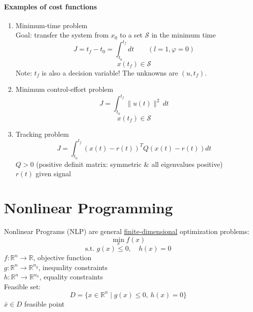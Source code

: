 \documentclass[12pt,a4paper,oneside]{scrartcl}
\begin{document}
	\paragraph{Examples of cost functions}
	\begin{enumerate}[label=\arabic*)]
		\item Minimum-time problem\\
		Goal: transfer the system from $x_0$ to a set $\mathcal{S}$ in the minimum time
		\[
		J = t_f-t_0 = \int_{t_0}^{t_f}dt \qquad (l=1, \varphi=0)
		\]
		\[
		x(t_f) \in \mathcal{S}
		\]
		Note: $t_f$ is also a decision variable! The unknowns are $(u,t_f)$.
		
		\item Minimum control-effort problem
		\[
		J = \int_{t_0}^{t_f} \|u(t)\|^2 \, dt
		\]
		\[
		x(t_f) \in \mathcal{S}
		\]
		
		\item Tracking problem
		\[
		J = \int_{t_0}^{t_f} (x(t)-r(t))^T Q (x(t)-r(t))dt
		\]
		$Q > 0$ (positive definit matrix: symmetric \& all eigenvalues positive) \\
		$r(t)$ given signal
	\end{enumerate}
	
	\section{Nonlinear Programming}
	
	Nonlinear Programs (NLP) are general \underline{finite-dimensional} optimization problems:
	\[
	\underset{x}{\min} f(x)
	\]
	\[
	\text{s.t. } g(x)\leq0, \quad h(x)=0
	\]
	$f: \mathbb{R}^n \to \mathbb{R}$, objective function\\
	$g: \mathbb{R}^n \to \mathbb{R}^{n_g}$, inequality constraints\\
	$h: \mathbb{R}^n \to \mathbb{R}^{n_h}$, equality constraints\\
	Feasible set:
	\[
	D = \{x\in\mathbb{R}^n \mid g(x)\leq0,\ h(x)=0\}
	\]
	$\bar{x}\in D$ feasible point
	
\end{document}
